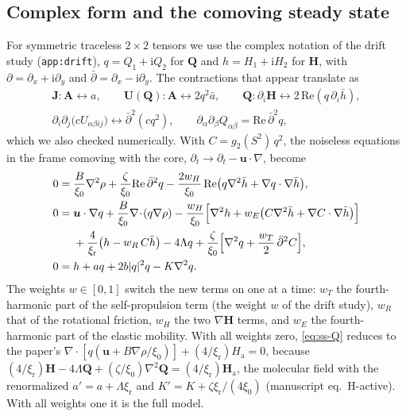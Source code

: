 \documentclass[11pt,a4paper]{article}
\newcommand{\upd}[1]{{\color{OliveGreen}#1}}
\newcommand{\Q}{\mathbf{Q}}
\renewcommand{\H}{\mathbf{H}}
\newcommand{\J}{\mathbf{J}}
\newcommand{\U}{\mathbf{U}}
\renewcommand{\u}{\bm{u}}
\newcommand{\ab}{{\alpha\beta}}
\newcommand{\xir}{\xi_\mathrm{r}}
\newcommand{\ii}{\mathrm{i}}
\newcommand{\dbar}{\bar\partial}
\begin{document}
\subsection{Complex form and the comoving steady state}
For symmetric traceless $2\times2$ tensors we use the complex notation of the drift study
(\texttt{app:drift}), $q=Q_1+\ii Q_2$ for $\Q$ and $h=H_1+\ii H_2$ for $\H$, with
$\partial=\partial_x+\ii\partial_y$ and $\dbar=\partial_x-\ii\partial_y$. The contractions
that appear translate as
\begin{gather}
  \J\!:\!\mathbf A\leftrightarrow a,\qquad
  \U(\Q)\!:\!\mathbf A\leftrightarrow2q^2\bar a,\qquad
  \Q\!:\!\partial_i\H\leftrightarrow2\,\mathrm{Re}(q\,\partial_i\bar h),
  \nonumber\\
  \partial_i\partial_j\bigl(cU_{\ab ij}\bigr)\leftrightarrow\dbar^2(cq^2),\qquad
  \partial_\alpha\partial_\beta Q_\ab=\mathrm{Re}\,\dbar^2q,
\end{gather}
which we also checked numerically. With $C=g_2(S^2)\,q^2$, the noiseless equations in the
frame comoving with the core, $\partial_t\to\partial_t-\u\cdot\nabla$, become
\begin{align}
  0 ={}& \frac B{\xi_0}\nabla^2\rho+\frac{\zeta}{\xi_0}\mathrm{Re}\,\dbar^2q
  -\frac{2w_H}{\xi_0}\,\mathrm{Re}\bigl(q\nabla^2\bar h+\nabla q\cdot\nabla\bar h\bigr),
  \label{eq:ss-rho}\\
  0 ={}& \u\cdot\nabla q+\frac B{\xi_0}\nabla\!\cdot\!(q\nabla\rho)
  -\frac{w_H}{\xi_0}\Bigl[\nabla^2h+w_E\bigl(C\nabla^2\bar h+\nabla C\cdot\nabla\bar h\bigr)\Bigr]
  \nonumber\\
  &+\frac4{\xir}\bigl(h-w_R\,C\bar h\bigr)-4\Lambda q
  +\frac{\zeta}{\xi_0}\Bigl[\nabla^2q+\frac{w_T}2\,\dbar^2C\Bigr],
  \label{eq:ss-Q}\\
  0 ={}& h+aq+2b|q|^2q-K\nabla^2q .
  \label{eq:ss-H}
\end{align}
The weights $w\in[0,1]$ switch the new terms on one at a time: $w_T$ the fourth-harmonic
part of the self-propulsion term (the weight $w$ of the drift study), $w_R$ that of the rotational
friction, $w_H$ \upd{the two $\nabla\H$ terms}, and $w_E$ the fourth-harmonic part of
the elastic mobility. With all weights zero, \cref{eq:ss-Q} reduces to the paper's
$\nabla\!\cdot\![q(\u+B\nabla\rho/\xi_0)]+(4/\xir)H_\mathrm{a}=0$, because
$(4/\xir)\H-4\Lambda\Q+(\zeta/\xi_0)\nabla^2\Q=(4/\xir)\H_\mathrm a$, the molecular field
with the renormalized $a'=a+\Lambda\xir$ and $K'=K+\zeta\xir/(4\xi_0)$ (manuscript
eq.~H-active). With all weights one it is the full model.
\end{document}
